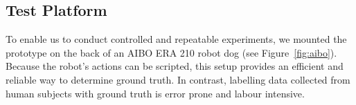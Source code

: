 \subsection{Test Platform}
\label{sec:testPlatform}

To enable us to conduct controlled and repeatable experiments, we
mounted the prototype on the back of an AIBO ERA 210 robot
dog (see Figure~\ref{fig:aibo}).  Because the robot's actions can be
scripted, this setup provides an efficient and reliable way to
determine ground truth.  In contrast, labelling data collected from
human subjects with ground truth is error prone and labour intensive.

